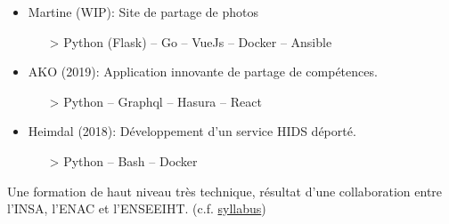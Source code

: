 \documentclass[10pt,a4paper,ragged2e,withhyper]{altacv}
\begin{document}
\begin{paracol}{2}
  \begin{itemize}
    \item Martine (WIP): Site de partage de photos
      \begin{itemize}
        \item[>] Python (Flask) -- Go -- VueJs -- Docker -- Ansible
      \end{itemize}
    \item AKO (2019): Application innovante de partage de compétences.
      \begin{itemize}
        \item[>] Python -- Graphql -- Hasura -- React
      \end{itemize}
    \item Heimdal (2018): Développement d'un service HIDS déporté.
      \begin{itemize}
        \item[>] Python -- Bash -- Docker
      \end{itemize}
  \end{itemize}

\medskip

\switchcolumn



  \divider\smallskip



  \divider

  \divider

\medskip


  Une formation de haut niveau très technique, résultat d'une collaboration entre
  l'INSA, l'ENAC et l'ENSEEIHT. (c.f. \href{https://tls-sec.github.io/documents/Syllabus_Ms_securite_Informatique_V1.pdf}{syllabus})


\end{paracol}
\end{document}
